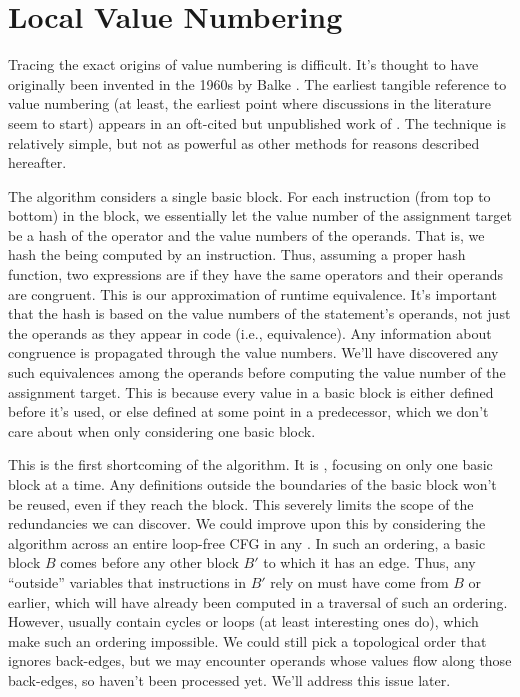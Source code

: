 \section{Local Value Numbering}\label{sec:vn:local}

Tracing the exact origins of value numbering is difficult.  It's thought to
have originally been invented in the 1960s by Balke \autocite{Simpson}.  The
earliest tangible reference to value numbering (at least, the earliest point
where discussions in the literature seem to start) appears in an oft-cited but
unpublished work of \citeauthor{Cocke} \autocite*{Cocke}.  The technique is
relatively simple, but not as powerful as other methods for reasons described
hereafter.

The algorithm considers a single basic block.  For each instruction (from top
to bottom) in the block, we essentially let the value number of the assignment
target be a hash of the operator and the value numbers of the operands.  That
is, we hash the  being computed by an instruction.  Thus,
assuming a proper hash function, two expressions are  if they
have the same operators and their operands are congruent.  This is our
approximation of runtime equivalence.  It's important that the hash is based on
the value numbers of the statement's operands, not just the operands as they
appear in code (i.e.,  equivalence).  Any information about
congruence is propagated through the value numbers.  We'll have discovered any
such equivalences among the operands before computing the value number of the
assignment target.  This is because every value in a basic block is either
defined before it's used, or else defined at some point in a predecessor, which
we don't care about when only considering one basic block.

This is the first shortcoming of the algorithm.  It is , focusing
on only one basic block at a time.  Any definitions outside the boundaries of
the basic block won't be reused, even if they reach the block.  This severely
limits the scope of the redundancies we can discover.  We could improve upon
this by considering the algorithm across an entire loop-free \gls{CFG} in any
.  In such an ordering, a basic block $B$ comes before
any other block $B'$ to which it has an edge.  Thus, any ``outside'' variables
that instructions in $B'$ rely on must have come from $B$ or earlier, which
will have already been computed in a traversal of such an ordering.  However,
 usually contain cycles or loops (at least interesting ones do),
which make such an ordering impossible.  We could still pick a topological
order that ignores back-edges, but we may encounter operands whose values flow
along those back-edges, so haven't been processed yet.  We'll address this
issue later.

